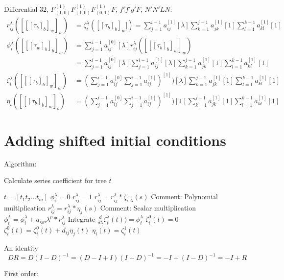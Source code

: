 \documentclass[english,unicode]{article}
\begin{document}
Differential 32, $F^{(1)}_{(1,0)}F^{(1)}_{(1,0)}F^{(1)}_{(0,1)}F$, $f'f'g'F$, $N'N'LN$:
\begin{align*}
r_{ij}^\lambda([[[\tau_b]_b]_w]_w)& =\zeta_i^{\lambda}([[\tau_b]_b]_w])=\sum_{j=1}^{i-1}a_{ij}^{[1]}[\lambda]\sum_{k=1}^{j-1}a_{jk}^{[1]}[1]\sum_{l=1}^{k-1}a_{kl}^{[1]}[1]\\
\phi_i^\lambda([[[\tau_w]_b]_b]_w)&= \sum_{j=1}^{i-1}a_{ij}^{[0]}[\lambda]r_{ij}^\lambda ([[[\tau_b]_b]_w]_w)\\
& = \sum_{j=1}^{i-1}a_{ij}^{[0]}[\lambda]\sum_{j=1}^{i-1}a_{ij}^{[1]}[\lambda]\sum_{k=1}^{j-1}a_{jk}^{[1]}[1]\sum_{l=1}^{k-1}a_{kl}^{[1]}[1]\\
\zeta_i^\lambda([[[\tau_b]_b]_w]_w)& =(\sum_{j=1}^{i-1}a_{ij}^{[0]}\sum_{j=1}^{i-1}a_{ij}^{[1]})^{[1]})[\lambda]\sum_{k=1}^{j-1}a_{jk}^{[1]}[1]\sum_{l=1}^{k-1}a_{kl}^{[1]}[1]\\
\eta_i([[[\tau_b]_b]_w]_b)& =(\sum_{j=1}^{i-1}a_{ij}^{[0]}\sum_{j=1}^{i-1}a_{ij}^{[1]})^{[1]})[1]\sum_{k=1}^{j-1}a_{jk}^{[1]}[1]\sum_{l=1}^{k-1}a_{kl}^{[1]}[1]\
\end{align*}


\section{Adding shifted initial conditions}
Algorithm:

\begin{algorithm}
\caption{Calculate series coefficient for tree $t$}
\begin{algorithmic}
\STATE $t=[t_1t_2\ldots t_m]$
\STATE $\phi_i^\lambda=0$
\STATE  $r_{ij}^\lambda=1$
\STATE $r_{ij}^\lambda=r_{ij}^\lambda*\zeta_{i,\lambda}(s)$ Comment: Polynomial multiplication
\ELSE
\STATE $r_{ij}^\lambda=r_{ij}^\lambda*\eta_j(s)$ Comment: Scalar multiplication
\ENDIF
\ENDFOR
{}
\STATE $\phi_i^\lambda=\phi_i^\lambda+a_{ijp}\lambda^p*r_{ij}^\lambda$
\ENDFOR
\ENDFOR
\STATE Integrate $\frac{d}{d\lambda}\zeta_i^\lambda(t))=\phi_i^\lambda $
\STATE $\zeta_i^0(t)=0$
\STATE $\zeta_i^0(t)=\zeta_i^0(t)+d_{ij}\eta_j(t)$
\ENDFOR
\STATE $\eta_i(t)=\zeta_{i}^1(t)$ 
\ENDFOR
\end{algorithmic}
\end{algorithm}

An identity
$$
DR=D(I-D)^{-1}=(D-I+I)(I-D)^{-1}=-I+(I-D)^{-1}=-I+R
$$

First order:
\end{document}
